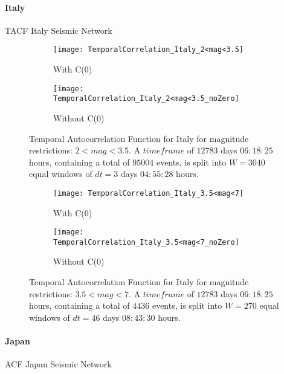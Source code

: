 \clearpage
\paragraph{Italy} TACF Italy Seismic Network

\begin{figure}[!ht]
\begin{subfigure}{.5\textwidth}
  \centering
  \texttt{[image: TemporalCorrelation\_Italy\_2<mag<3.5]}
  \caption{With C(0)}
  \label{fig:corrItaly2_3.5}
\end{subfigure}%
\begin{subfigure}{.5\textwidth}
  \centering
  \texttt{[image: TemporalCorrelation\_Italy\_2<mag<3.5\_noZero]}
  \caption{Without C(0)}
  \label{fig:corrItaly2_3.5_noZero}
\end{subfigure}
\caption{Temporal Autocorrelation Function for Italy for magnitude restrictions: $2<mag<3.5$. A $timeframe$ of $12783$ days $06:18:25$ hours, containing a total of $95004$ events, is split into $W=3040$ equal windows of $dt=3$ days $04:55:28$ hours.}
\label{fig:corrItaly2_3.5!}
\end{figure}

\begin{figure}[!ht]
\begin{subfigure}{.5\textwidth}
  \centering
  \texttt{[image: TemporalCorrelation\_Italy\_3.5<mag<7]}
  \caption{With C(0)}
  \label{fig:corrItaly3.5_7}
\end{subfigure}%
\begin{subfigure}{.5\textwidth}
  \centering
  \texttt{[image: TemporalCorrelation\_Italy\_3.5<mag<7\_noZero]}
  \caption{Without C(0)}
  \label{fig:corrItaly3.5_7_noZero}
\end{subfigure}
\caption{Temporal Autocorrelation Function for Italy for magnitude restrictions: $3.5<mag<7$. A $timeframe$ of $12783$ days $06:18:25$ hours, containing a total of $4436$ events, is split into $W=270$ equal windows of $dt=46$ days $08:43:30$ hours.}
\label{fig:corrItaly3.5_7!}
\end{figure}



\clearpage
\paragraph{Japan} ACF Japan Seismic Network

